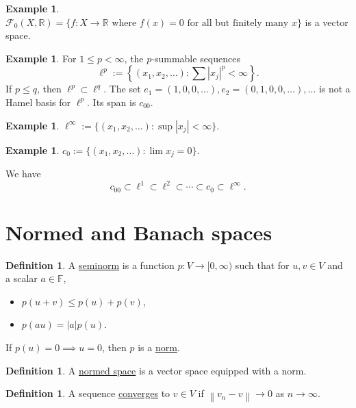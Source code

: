 \documentclass[12pt]{article}
\newcommand{\abs}[1]{\left| #1 \right|}
\newcommand{\norm}[1]{\left\| #1 \right\|}
\newcommand{\R}{\mathbb{R}}
\newcommand{\F}{\mathbb{F}}
\theoremstyle{definition}
\newtheorem{defn}[thm]{Definition}
\newtheorem{ex}[thm]{Example}
\begin{document}
\begin{ex}
	$\mathscr{F}_0(X,\R) = \lbrace f : X \to \R \text{ where } f(x) = 0 \text{ for all but finitely many } x \rbrace$ is a vector space.
\end{ex}

\begin{ex}
	For $1 \leq p < \infty$, the $p$-summable sequences
	\begin{equation*}
		\ell^p := \left\lbrace (x_1, x_2, \dots) : \sum \abs{x_j}^p < \infty \right\rbrace.
	\end{equation*}
	If $p \leq q$, then $\ell^p \subset \ell^q$.
	The set $e_1 = (1,0,0,\dots), e_2 = (0,1,0,0,\dots), \dots$ is not a Hamel basis for $\ell^p$.
	Its span is $c_{00}$.
\end{ex}

\begin{ex}
	$\ell^\infty := \lbrace (x_1, x_2, \dots) : \sup \abs{x_j} < \infty \rbrace$.
\end{ex}

\begin{ex}
	$c_0 := \lbrace (x_1, x_2, \dots) : \lim x_j = 0 \rbrace$.
\end{ex}

\noindent We have
\begin{equation*}
	c_{00} \subset \ell^1 \subset \ell^2 \subset \cdots \subset c_0 \subset \ell^\infty.
\end{equation*}

\section{Normed and Banach spaces}

\begin{defn}
	A \underline{seminorm} is a function $p : V \to [0,\infty)$ such that for $u, v \in V$ and a scalar $a \in \F$,
	\begin{itemize}[nosep]
		\item $p(u+v) \leq p(u) + p(v)$,
		\item $p(au) = \abs{a} p(u)$.
	\end{itemize}
	If $p(u) = 0 \implies u = 0$, then $p$ is a \underline{norm}.
\end{defn}

\begin{defn}
	A \underline{normed space} is a vector space equipped with a norm.
\end{defn}

\begin{defn}
	A sequence \underline{converges} to $v \in V$ if $\norm{v_n - v} \to 0$ as $n \to \infty$.
\end{defn}
\end{document}
